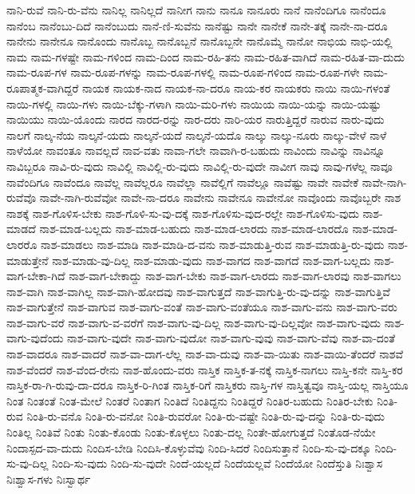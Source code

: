 {ನಾನಿ-ರುವೆ
ನಾನಿ-ರು-ವೆನು
ನಾನಿಲ್ಲ
ನಾನಿಲ್ಲದೆ
ನಾನೀಗ
ನಾನು
ನಾನೂ
ನಾನೂರು
ನಾನೆ
ನಾನೆಂದಿಗೂ
ನಾನೆಂದೂ
ನಾನೆಂಬ
ನಾನೆಂಬು-ದಿದೆ
ನಾನೆಂಬುದು
ನಾನೆ-ಣಿ-ಸುವೆನು
ನಾನೆಷ್ಟು
ನಾನೇ
ನಾನೇಕೆ
ನಾನೇ-ತಕ್ಕೆ
ನಾನೇ-ನಾ-ದರೂ
ನಾನೇನು
ನಾನೇನೂ
ನಾನೊಂದು
ನಾನೊಬ್ಬ
ನಾನೊಬ್ಬನೆ
ನಾನೊಬ್ಬನೇ
ನಾನೊಮ್ಮೆ
ನಾನೋ
ನಾಭಿಯ
ನಾಭಿ-ಯಲ್ಲಿ
ನಾಮ
ನಾಮ-ಗಳಷ್ಟೇ
ನಾಮ-ಗಳಿಂದ
ನಾಮ-ದಿಂದ
ನಾಮ-ರಹಿ-ತನು
ನಾಮ-ರಹಿತ-ವಾಗಿದೆ
ನಾಮ-ರಹಿತ-ವಾ-ದುದು
ನಾಮ-ರೂಪ-ಗಳ
ನಾಮ-ರೂಪ-ಗಳನ್ನು
ನಾಮ-ರೂಪ-ಗಳಲ್ಲಿ
ನಾಮ-ರೂಪ-ಗಳಿಂದ
ನಾಮ-ರೂಪ-ಗಳೇ
ನಾಮ-ರೂಪಾತ್ಮಕ-ವಾಗಿದ್ದರೆ
ನಾಯಕ
ನಾಯಕ-ನಾದ
ನಾಯಕ-ನಾ-ದರೂ
ನಾಯ-ಕರ
ನಾಯಕರು
ನಾಯಿ
ನಾಯಿ-ಗಳಂತೆ
ನಾಯಿ-ಗಳಲ್ಲಿ
ನಾಯಿ-ಗಳು
ನಾಯಿ-ಬೆಕ್ಕು-ಗಳಾಗಿ
ನಾಯಿ-ಮರಿ-ಗಳು
ನಾಯಿಯ
ನಾಯಿ-ಯನ್ನು
ನಾಯಿ-ಯಷ್ಟು
ನಾಯಿಯು
ನಾಯಿ-ಯೊಂದು
ನಾರದ
ನಾರದ-ರನ್ನು
ನಾರ-ದರು
ನಾರಿ-ಯರ
ನಾರುತ್ತಿದ್ದರೆ
ನಾರುವ
ನಾರು-ವುದು
ನಾಲಗೆ
ನಾಲ್ಕ-ನೆಯ
ನಾಲ್ಕನೆ-ಯದು
ನಾಲ್ಕನೆ-ಯದೆ
ನಾಲ್ಕನೆ-ಯದೊ
ನಾಲ್ಕು
ನಾಲ್ಕು-ನೂರು
ನಾಲ್ಕು-ವೇಳೆ
ನಾಳೆ
ನಾಳೆಯೋ
ನಾವಂತೂ
ನಾವಲ್ಲದೆ
ನಾವ-ವತು
ನಾವಾ-ಗಲೇ
ನಾವಾಗಿ-ರ-ಬಹುದು
ನಾವಿಂದು
ನಾವಿನ್ನು
ನಾವಿನ್ನೂ
ನಾವಿಬ್ಬರೂ
ನಾವಿ-ರು-ವುದು
ನಾವಿಲ್ಲಿ
ನಾವಿಲ್ಲಿ-ರು-ವುದು
ನಾವಿಲ್ಲಿ-ರು-ವುದೇ
ನಾವೀಗ
ನಾವು
ನಾವು-ಗಳೆಲ್ಲ
ನಾವೂ
ನಾವೆಂದಿಗೂ
ನಾವೆಂದೂ
ನಾವೆಲ್ಲ
ನಾವೆಲ್ಲರೂ
ನಾವೆಲ್ಲಾ
ನಾವೆಲ್ಲಿಗೆ
ನಾವೆಲ್ಲೂ
ನಾವೆಷ್ಟು
ನಾವೇ
ನಾವೇಕೆ
ನಾವೇ-ನಾಗಿ-ರುವೆವೊ
ನಾವೇ-ನಾಗಿ-ರುವೆವೋ
ನಾವೇ-ನಾ-ದರೂ
ನಾವೇನು
ನಾವೇನೂ
ನಾವೇನೋ
ನಾವೊಂದು
ನಾವೊಬ್ಬರೇ
ನಾಶ
ನಾಶಕ್ಕೆ
ನಾಶ-ಗೊಳಿಸ-ಬೇಕು
ನಾಶ-ಗೊಳಿ-ಸು-ವು-ದಕ್ಕೆ
ನಾಶ-ಗೊಳಿಸು-ವುದ-ರಲ್ಲೇ
ನಾಶ-ಗೊಳಿಸು-ವುದು
ನಾಶ-ಮಾಡದೆ
ನಾಶ-ಮಾಡ-ಬಲ್ಲದು
ನಾಶ-ಮಾಡ-ಬಹುದು
ನಾಶ-ಮಾಡ-ಲಾರದು
ನಾಶ-ಮಾಡ-ಲಾರದೊ
ನಾಶ-ಮಾಡ-ಲಾರರೊ
ನಾಶ-ಮಾಡಲು
ನಾಶ-ಮಾಡಿ
ನಾಶ-ಮಾಡಿ-ದ-ವನು
ನಾಶ-ಮಾಡುತ್ತಿ-ರುವ
ನಾಶ-ಮಾಡುತ್ತಿ-ರು-ವುದು
ನಾಶ-ಮಾಡುತ್ತೇನೆ
ನಾಶ-ಮಾಡು-ವು-ದಿಲ್ಲ
ನಾಶ-ಮಾಡು-ವುದು
ನಾಶ-ವಾಗದ
ನಾಶ-ವಾಗದೆ
ನಾಶ-ವಾಗ-ಬಲ್ಲದು
ನಾಶ-ವಾಗ-ಬೇಕಾ-ಗಿದೆ
ನಾಶ-ವಾಗ-ಬೇಕಾದ್ದು
ನಾಶ-ವಾಗ-ಬೇಕು
ನಾಶ-ವಾಗ-ಲಾರದು
ನಾಶ-ವಾಗ-ಲಾರವು
ನಾಶ-ವಾಗಲು
ನಾಶ-ವಾಗಿ
ನಾಶ-ವಾಗಿಲ್ಲ
ನಾಶ-ವಾಗಿ-ಹೋದವು
ನಾಶ-ವಾಗುತ್ತದೆ
ನಾಶ-ವಾಗುತ್ತಿ-ರು-ವು-ದನ್ನು
ನಾಶ-ವಾಗುತ್ತಿವೆ
ನಾಶ-ವಾಗುತ್ತೇನೆ
ನಾಶ-ವಾಗುವ
ನಾಶ-ವಾಗು-ವಂತೆ
ನಾಶ-ವಾಗು-ವಂತೆಯೂ
ನಾಶ-ವಾಗು-ವನು
ನಾಶ-ವಾಗು-ವರು
ನಾಶ-ವಾಗು-ವರೆ
ನಾಶ-ವಾಗು-ವ-ವರೆಗೆ
ನಾಶ-ವಾಗು-ವು-ದಿಲ್ಲ
ನಾಶ-ವಾಗು-ವು-ದಿಲ್ಲವೋ
ನಾಶ-ವಾಗು-ವುದು
ನಾಶ-ವಾಗು-ವುದೆಂದು
ನಾಶ-ವಾಗು-ವುದೇ
ನಾಶ-ವಾಗು-ವುದೋ
ನಾಶ-ವಾಗು-ವುವು
ನಾಶ-ವಾಗು-ವೆವು
ನಾಶ-ವಾ-ದಂತೆ
ನಾಶ-ವಾದರೂ
ನಾಶ-ವಾದರೆ
ನಾಶ-ವಾ-ದಾಗ-ಲೆಲ್ಲ
ನಾಶ-ವಾ-ದುವು
ನಾಶ-ವಾ-ಯಿತು
ನಾಶ-ವಾಯಿ-ತೆಂದರೆ
ನಾಶವೆ
ನಾಶ-ವೆಂದರೆ
ನಾಶ-ವೆಂದ-ರೇನು
ನಾಶ-ಹೊಂದು-ವರು
ನಾಸ್ತಿಕ
ನಾಸ್ತಿಕ-ತ-ನಕ್ಕೆ
ನಾಸ್ತಿಕ-ನಾಗಲು
ನಾಸ್ತಿ-ಕನೇ
ನಾಸ್ತಿ-ಕರ
ನಾಸ್ತಿಕ-ರಾ-ಗಿ-ರುವು-ದಾ-ದರೂ
ನಾಸ್ತಿಕ-ರಿ-ಗಿಂತ
ನಾಸ್ತಿಕ-ರಿಗೆ
ನಾಸ್ತಿಕರು
ನಾಸ್ತಿ-ಗಳ
ನಾಸ್ತಿತ್ವವೂ
ನಾಸ್ತಿ-ಯಲ್ಲ
ನಾಸ್ತಿಯೂ
ನಿಂತ
ನಿಂತಂತೆ
ನಿಂತ-ಮೇಲೆ
ನಿಂತರೆ
ನಿಂತಾಗ
ನಿಂತಿದೆ
ನಿಂತಿದ್ದನು
ನಿಂತಿದ್ದರೆ
ನಿಂತಿರ-ಬಹುದು
ನಿಂತಿರ-ಬೇಕು
ನಿಂತಿ-ರುವ
ನಿಂತಿ-ರು-ವನೊ
ನಿಂತಿ-ರು-ವನೋ
ನಿಂತಿ-ರುವರೋ
ನಿಂತಿ-ರು-ವಷ್ಟೇ
ನಿಂತಿ-ರು-ವು-ದನ್ನು
ನಿಂತಿ-ರು-ವುದು
ನಿಂತಿಲ್ಲ
ನಿಂತಿವೆ
ನಿಂತು
ನಿಂತು-ಕೊಂಡು
ನಿಂತು-ಕೊಳ್ಳಲು
ನಿಂತು-ದಲ್ಲ
ನಿಂತೇ-ಹೋಗುತ್ತದೆ
ನಿಂತೊಡ-ನೆಯೇ
ನಿಂದಾಸ್ಪದ-ವಾ-ದುದು
ನಿಂದಿಸ-ಬೇಡಿ
ನಿಂದಿಸಿ-ಕೊಳ್ಳುವೆವು
ನಿಂದಿ-ಸಿದರೆ
ನಿಂದಿಸುತ್ತಾನೆ
ನಿಂದಿ-ಸು-ವು-ದಕ್ಕೂ
ನಿಂದಿ-ಸು-ವು-ದಿಲ್ಲ
ನಿಂದಿ-ಸು-ವುದು
ನಿಂದಿ-ಸು-ವುದೇ
ನಿಂದೆ-ಯಲ್ಲದೆ
ನಿಂದೆಯಲ್ಲವೆ
ನಿಂದೆಯೋ
ನಿಂದೆಸ್ತುತಿ
ನಿಃಶ್ವಾಸ
ನಿಃಶ್ವಾಸ-ಗಳು
ನಿಃಸ್ವಾರ್ಥ
}
